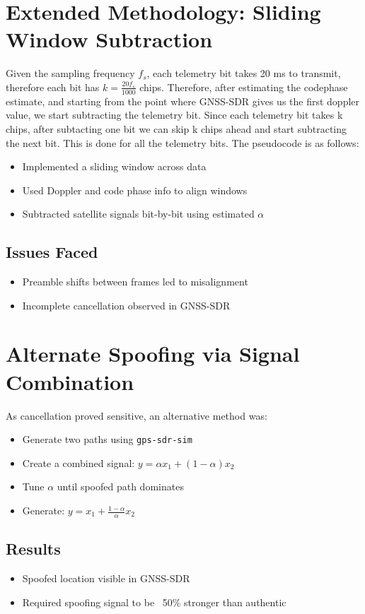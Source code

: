 \documentclass[12pt]{report}
\begin{document}
\section{Extended Methodology: Sliding Window Subtraction}
Given the sampling frequency $f_s$, each telemetry bit takes 20 ms to transmit, therefore each bit has $k = \frac{20f_s}{1000}$ chips. Therefore, after estimating the codephase estimate, and starting from the point where GNSS-SDR gives us the first doppler value, we start subtracting the telemetry bit.
Since each telemetry bit takes k chips, after subtacting one bit we can skip k chips ahead and start subtracting the next bit. This is done for all the telemetry bits. The pseudocode is as follows:
\begin{algorithm}
\begin{itemize}
  \item Implemented a sliding window across data
  \item Used Doppler and code phase info to align windows
  \item Subtracted satellite signals bit-by-bit using estimated $\alpha$
\end{itemize}

\subsection*{Issues Faced}
\begin{itemize}
  \item Preamble shifts between frames led to misalignment
  \item Incomplete cancellation observed in GNSS-SDR
\end{itemize}

\section{Alternate Spoofing via Signal Combination}
As cancellation proved sensitive, an alternative method was:
\begin{itemize}
  \item Generate two paths using \texttt{gps-sdr-sim}
  \item Create a combined signal: \( y = \alpha x_1 + (1-\alpha)x_2 \)
  \item Tune $\alpha$ until spoofed path dominates
  \item Generate: \( y = x_1 + \frac{1-\alpha}{\alpha}x_2 \)
\end{itemize}

\subsection*{Results}
\begin{itemize}
  \item Spoofed location visible in GNSS-SDR
  \item Required spoofing signal to be ~50\% stronger than authentic
\end{itemize}


\end{algorithm}
\end{document}

